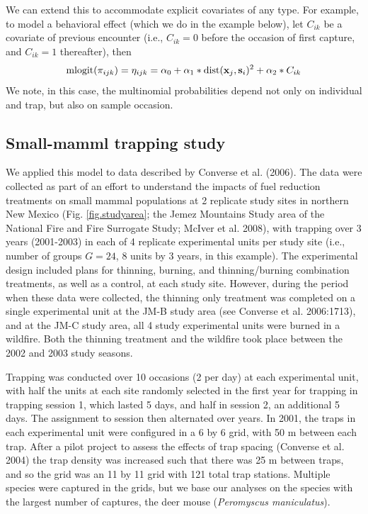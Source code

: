 We can extend this to accommodate explicit 
covariates of any type.
For example, to model a behavioral
effect (which we do in the example below), let 
$C_{ik}$ be a covariate of previous encounter
(i.e., $C_{ik} = 0$ before the occasion of first capture, and $C_{ik}
= 1$ thereafter), then
\[
\mbox{mlogit}(\pi_{ijk}) = \eta_{ijk} = \alpha_{0}  +\alpha_{1}*\mbox{dist}({\bf  x}_{j},{\bf s}_{i})^2 +  \alpha_{2}*C_{ik}
\]
We note, in this case, the multinomial probabilities depend not only
on individual and trap, but also on sample occasion.

\subsection{Small-mamml trapping study}


We applied this model to data described by Converse et al. (2006). The
data were collected as part of an effort to understand the impacts of
fuel reduction treatments on small mammal populations at 2 replicate
study sites in northern New Mexico (Fig. \ref{fig.studyarea}; 
the Jemez Mountains Study area of
the National Fire and Fire Surrogate Study; McIver et al. 2008), with
trapping over 3 years (2001-2003) in each of 4 replicate experimental
units per study site (i.e., number of groups $G = 24$, 8 units by 3
years, in this example).  The experimental design included plans for
thinning, burning, and thinning/burning combination treatments, as
well as a control, at each study site. However, during the period when
these data were collected, the thinning only treatment was completed
on a single experimental unit at the JM-B study area (see Converse et
al. 2006:1713), and at the JM-C study area, all 4 study experimental
units were burned in a wildfire. Both the thinning treatment and the
wildfire took place between the 2002 and 2003 study seasons.

Trapping was conducted over 10 occasions (2 per day) at each
experimental unit, with half the units at each site randomly selected
in the first year for trapping in trapping session 1, which lasted 5
days, and half in session 2, an additional 5 days. The assignment to
session then alternated over years.  In 2001, the traps in each
experimental unit were configured in a 6 by 6 grid, with 50 m between
each trap. After a pilot project to assess the effects of trap spacing
(Converse et al. 2004) the trap density was increased such that there
was 25 m between traps, and so the grid was an 11 by 11 grid with 121
total trap stations. Multiple species were captured in the grids, but
we base our analyses on the species with the largest number of
captures, the deer mouse ({\it Peromyscus maniculatus}).

